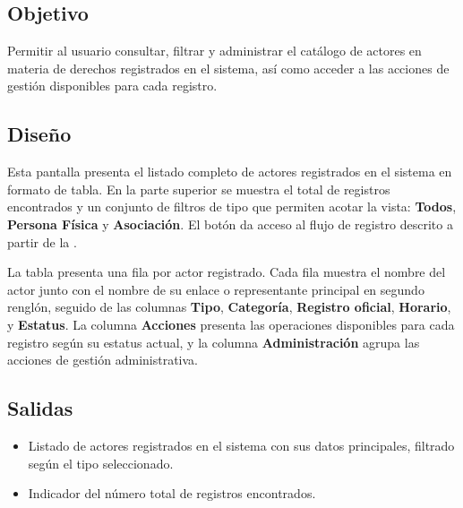 \subsection{Objetivo}
Permitir al usuario consultar, filtrar y administrar el catálogo de actores en 
materia de derechos registrados en el sistema, así como acceder a las acciones 
de gestión disponibles para cada registro.

\subsection{Diseño}
Esta pantalla  presenta el listado completo de actores registrados en el sistema 
en formato de tabla. En la parte superior se muestra el total de registros 
encontrados y un conjunto de filtros de tipo que permiten acotar la vista: 
\textbf{Todos}, \textbf{Persona Física} y \textbf{Asociación}. El botón 
 da acceso al flujo de registro descrito a partir de 
la .

La tabla presenta una fila por actor registrado. Cada fila muestra el nombre 
del actor junto con el nombre de su enlace o representante principal en 
segundo renglón, seguido de las columnas \textbf{Tipo}, \textbf{Categoría}, 
\textbf{Registro oficial}, \textbf{Horario}, y \textbf{Estatus}. La columna 
\textbf{Acciones} presenta las operaciones disponibles para cada registro según 
su estatus actual, y la columna \textbf{Administración} agrupa las acciones 
de gestión administrativa.




\subsection{Salidas}
\begin{itemize}
	\item Listado de actores registrados en el sistema con sus datos 
	principales, filtrado según el tipo seleccionado.
	\item Indicador del número total de registros encontrados.
\end{itemize}


